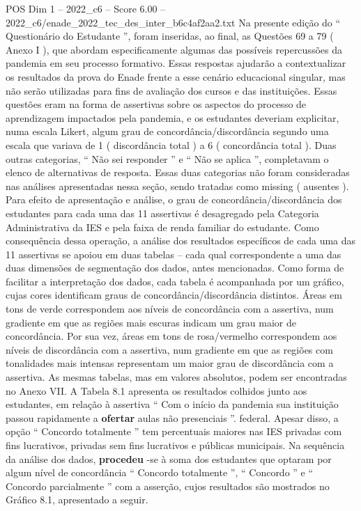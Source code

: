 \begin{textsample}{POS Dim 1 – 2022\_c6 – Score 6.00 – 2022\_c6/enade\_2022\_tec\_des\_inter\_b6c4af2aa2.txt}
Na presente edição do “ Questionário do Estudante ”, foram inseridas, ao final, as Questões 69 a 79 ( Anexo I ), que abordam especificamente algumas das possíveis repercussões da pandemia em seu processo formativo.
Essas respostas ajudarão a contextualizar os resultados da prova do Enade frente a esse cenário educacional singular, mas não serão utilizadas para fins de avaliação dos cursos e das instituições.
Essas questões eram na forma de assertivas sobre os aspectos do processo de aprendizagem impactados pela pandemia, e os estudantes deveriam explicitar, numa escala Likert, algum grau de concordância/discordância segundo uma escala que variava de 1 ( discordância total ) a 6 ( concordância total ).
Duas outras categorias, “ Não sei responder ” e “ Não se aplica ”, completavam o elenco de alternativas de resposta.
Essas duas categorias não foram consideradas nas análises apresentadas nessa seção, sendo tratadas como missing ( ausentes ).
Para efeito de apresentação e análise, o grau de concordância/discordância dos estudantes para cada uma das 11 assertivas é desagregado pela Categoria Administrativa da IES e pela faixa de renda familiar do estudante.
Como consequência dessa operação, a análise dos resultados específicos de cada uma das 11 assertivas se apoiou em duas tabelas – cada qual correspondente a uma das duas dimensões de segmentação dos dados, antes mencionadas.
Como forma de facilitar a interpretação dos dados, cada tabela é acompanhada por um gráfico, cujas cores identificam graus de concordância/discordância distintos.
Áreas em tons de verde correspondem aos níveis de concordância com a assertiva, num gradiente em que as regiões mais escuras indicam um grau maior de concordância.
Por sua vez, áreas em tons de rosa/vermelho correspondem aos níveis de discordância com a assertiva, num gradiente em que as regiões com tonalidades mais intensas representam um maior grau de discordância com a assertiva.
As mesmas tabelas, mas em valores absolutos, podem ser encontradas no Anexo VII.
A Tabela 8.1 apresenta os resultados colhidos junto aos estudantes, em relação à assertiva “ Com o início da pandemia sua instituição passou rapidamente a \textbf{ofertar} aulas não presenciais ”. federal.
Apesar disso, a opção “ Concordo totalmente ” tem percentuais maiores nas IES privadas com fins lucrativos, privadas sem fins lucrativos e públicas municipais.
Na sequência da análise dos dados, \textbf{procedeu} -se à soma dos estudantes que optaram por algum nível de concordância “ Concordo totalmente ”, “ Concordo ” e “ Concordo parcialmente ” com a asserção, cujos resultados são mostrados no Gráfico 8.1, apresentado a seguir.

\end{textsample}

